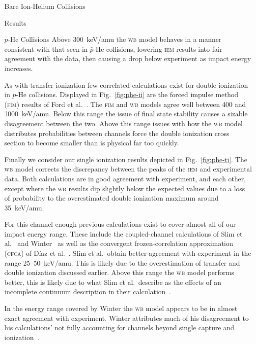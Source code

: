 \documentclass[a5paper, 9 pt]{extreport}
\begin{document}
\begin{chapter}{Bare Ion-Helium Collisions \label{chap:p-he2p-he}}
\begin{section}{Results \label{sec:phe2p-res}}
\begin{subsection}{\texorpdfstring{$p$}{p}-He Collisions \label{sec:phe-res}}
         Above 300~keV/amu the \textsc{wb} model behaves in a manner consistent with that seen in
         $\bar{p}$-He collisions, lowering \textsc{iem} results into fair agreement with the data, then
         causing a drop below experiment as impact energy increases.

         As with transfer ionization few correlated calculations exist for double ionization in $p$-He
         collisions. Displayed in Fig.~\ref{fig:phe-ii} are the forced impulse method (\textsc{fim})
         results of Ford et al.~\cite{FR-94}. The \textsc{fim} and \textsc{wb} models agree well between
         400 and 1000~keV/amu. Below this range the issue of final state stability causes a sizable
         disagreement between the two. Above this range issues with how the \textsc{wb} model
         distributes probabilities between channels force  the double ionization cross section to become
         smaller than is physical far too quickly.

         Finally we consider our single ionization results depicted in Fig.~\ref{fig:phe-ti}. The
         \textsc{wb} model corrects the discrepancy between the peaks of the \textsc{iem} and
         experimental data. Both calculations are in good agreement with experiment, and each other,
         except where the \textsc{wb} results dip slightly below the expected values due to a loss of
         probability to the overestimated double ionization maximum around 35~keV/amu.

         For this channel enough previous calculations exist to cover almost all of our impact energy
         range. These include the coupled-channel calculations of Slim et al.~\cite{SHBF-91} and
         Winter~\cite{Winter-91} as well as the convergent frozen-correlation approximation
         (\textsc{cfca}) of D\'{i}az et al.~\cite{DMS-00}. Slim et al.\ obtain better agreement with
         experiment in the range 25--50~keV/amu. This is likely due to the overestimation of transfer
         and double ionization discussed earlier. Above this range the \textsc{wb} model performs
         better, this is likely due to what Slim et al.\ describe as the effects of an incomplete
         continuum description in their calculation~\cite{SHBF-91}.

         In the energy range covered by Winter the \textsc{wb} model appears to be in almost exact
         agreement with experiment. Winter attributes much of his disagreement to his calculations' not
         fully accounting for channels beyond single capture and ionization~\cite{Winter-91}.


\end{subsection}
\end{section}
\end{chapter}
\end{document}
